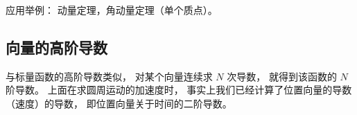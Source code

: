 应用举例： 动量定理，角动量定理（单个质点）。

\subsection{向量的高阶导数}
与标量函数的高阶导数类似， 对某个向量连续求 $N$ 次导数， 就得到该函数的 $N$ 阶导数。 上面在求圆周运动的加速度时， 事实上我们已经计算了位置向量的导数（速度）的导数， 即位置向量关于时间的二阶导数。
